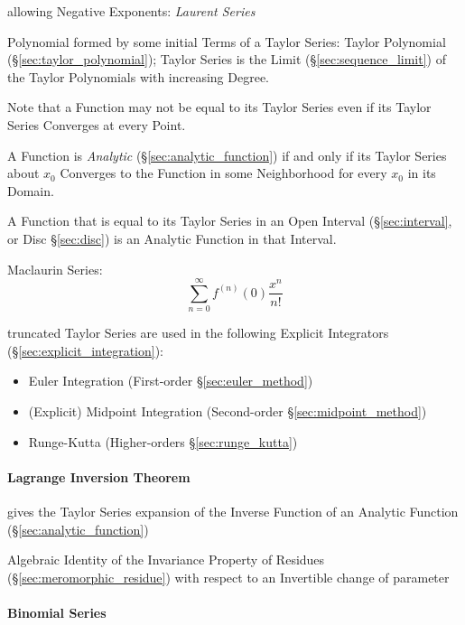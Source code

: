 allowing Negative Exponents: \emph{Laurent Series}

Polynomial formed by some initial Terms of a Taylor Series: Taylor
Polynomial (\S\ref{sec:taylor_polynomial}); Taylor Series is the Limit
(\S\ref{sec:sequence_limit}) of the Taylor Polynomials with increasing
Degree.

Note that a Function may not be equal to its Taylor Series even if its
Taylor Series Converges at every Point.

A Function is \emph{Analytic} (\S\ref{sec:analytic_function}) if and only if
its Taylor Series about $x_0$ Converges to the Function in some Neighborhood
for every $x_0$ in its Domain.

A Function that is equal to its Taylor Series in an Open Interval
(\S\ref{sec:interval}, or Disc \S\ref{sec:disc}) is an Analytic Function in
that Interval.

Maclaurin Series:
\[
  \sum_{n=0}^\infty f^{(n)}(0) \frac{x^n}{n!}
\]

truncated Taylor Series are used in the following Explicit Integrators
(\S\ref{sec:explicit_integration}):
\begin{itemize}
  \item Euler Integration (First-order \S\ref{sec:euler_method})
  \item (Explicit) Midpoint Integration (Second-order
    \S\ref{sec:midpoint_method})
  \item Runge-Kutta (Higher-orders \S\ref{sec:runge_kutta})
\end{itemize}



\paragraph{Lagrange Inversion Theorem}\label{sec:lagrange_inversion}\hfill

gives the Taylor Series expansion of the Inverse Function of an Analytic
Function (\S\ref{sec:analytic_function})

Algebraic Identity of the Invariance Property of Residues
(\S\ref{sec:meromorphic_residue}) with respect to an Invertible change of
parameter



\paragraph{Binomial Series}\label{sec:binomial_series}\hfill



